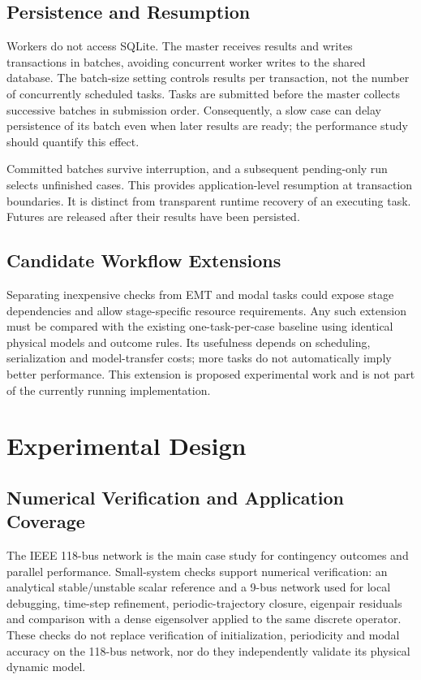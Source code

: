 \documentclass[journal]{IEEEtran}
\begin{document}
\subsection{Persistence and Resumption}
Workers do not access SQLite. The master receives results and writes transactions in batches, avoiding concurrent worker writes to the shared database. The batch-size setting controls results per transaction, not the number of concurrently scheduled tasks. Tasks are submitted before the master collects successive batches in submission order. Consequently, a slow case can delay persistence of its batch even when later results are ready; the performance study should quantify this effect.

Committed batches survive interruption, and a subsequent pending-only run selects unfinished cases. This provides application-level resumption at transaction boundaries. It is distinct from transparent runtime recovery of an executing task. Futures are released after their results have been persisted.

\subsection{Candidate Workflow Extensions}
Separating inexpensive checks from EMT and modal tasks could expose stage dependencies and allow stage-specific resource requirements. Any such extension must be compared with the existing one-task-per-case baseline using identical physical models and outcome rules. Its usefulness depends on scheduling, serialization and model-transfer costs; more tasks do not automatically imply better performance. This extension is proposed experimental work and is not part of the currently running implementation.

\section{Experimental Design}
\subsection{Numerical Verification and Application Coverage}
The IEEE 118-bus network is the main case study for contingency outcomes and parallel performance. Small-system checks support numerical verification: an analytical stable/unstable scalar reference and a 9-bus network used for local debugging, time-step refinement, periodic-trajectory closure, eigenpair residuals and comparison with a dense eigensolver applied to the same discrete operator. These checks do not replace verification of initialization, periodicity and modal accuracy on the 118-bus network, nor do they independently validate its physical dynamic model.
\end{document}
